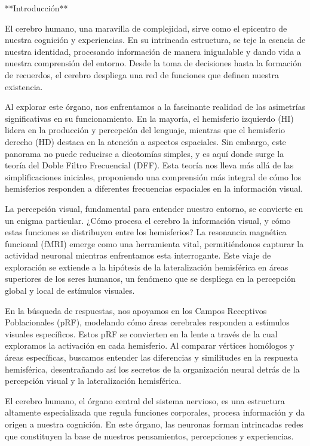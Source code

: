 \documentclass{article}
\begin{document}
	\newpage
	
	**Introducción**
	
	El cerebro humano, una maravilla de complejidad, sirve como el epicentro de nuestra cognición y experiencias. En su intrincada estructura, se teje la esencia de nuestra identidad, procesando información de manera inigualable y dando vida a nuestra comprensión del entorno. Desde la toma de decisiones hasta la formación de recuerdos, el cerebro despliega una red de funciones que definen nuestra existencia.
	
	Al explorar este órgano, nos enfrentamos a la fascinante realidad de las asimetrías significativas en su funcionamiento. En la mayoría, el hemisferio izquierdo (HI) lidera en la producción y percepción del lenguaje, mientras que el hemisferio derecho (HD) destaca en la atención a aspectos espaciales. Sin embargo, este panorama no puede reducirse a dicotomías simples, y es aquí donde surge la teoría del Doble Filtro Frecuencial (DFF). Esta teoría nos lleva más allá de las simplificaciones iniciales, proponiendo una comprensión más integral de cómo los hemisferios responden a diferentes frecuencias espaciales en la información visual.
	
	La percepción visual, fundamental para entender nuestro entorno, se convierte en un enigma particular. ¿Cómo procesa el cerebro la información visual, y cómo estas funciones se distribuyen entre los hemisferios? La resonancia magnética funcional (fMRI) emerge como una herramienta vital, permitiéndonos capturar la actividad neuronal mientras enfrentamos esta interrogante. Este viaje de exploración se extiende a la hipótesis de la lateralización hemisférica en áreas superiores de los seres humanos, un fenómeno que se despliega en la percepción global y local de estímulos visuales.
	
	En la búsqueda de respuestas, nos apoyamos en los Campos Receptivos Poblacionales (pRF), modelando cómo áreas cerebrales responden a estímulos visuales específicos. Estos pRF se convierten en la lente a través de la cual exploramos la activación en cada hemisferio. Al comparar vértices homólogos y áreas específicas, buscamos entender las diferencias y similitudes en la respuesta hemisférica, desentrañando así los secretos de la organización neural detrás de la percepción visual y la lateralización hemisférica.
	
	\newpage
	
	El cerebro humano, el órgano central del sistema nervioso, es una estructura altamente especializada que regula funciones corporales, procesa información y da origen a nuestra cognición. En este órgano, las neuronas forman intrincadas redes que constituyen la base de nuestros pensamientos, percepciones y experiencias.
	
\end{document}
